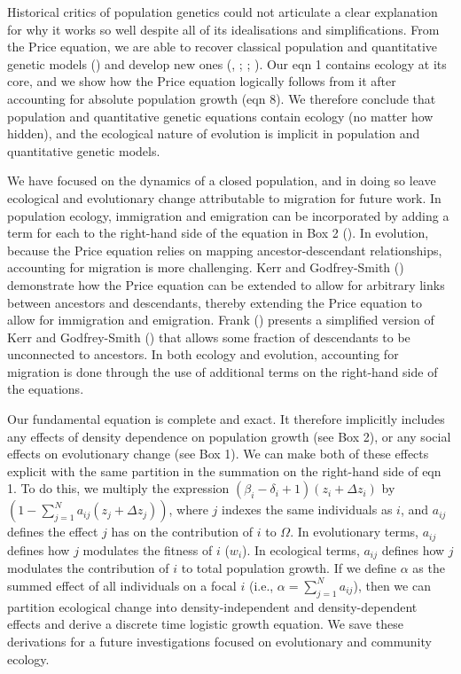 \documentclass[
]{article}
\begin{document}
Historical critics of population genetics could not articulate a clear
explanation for why it works so well despite all of its idealisations
and simplifications. From the Price equation, we are able to recover
classical population and quantitative genetic models
() and develop new ones
(, ;
; ). Our eqn 1 contains ecology at its core, and we show how the
Price equation logically follows from it after accounting for absolute
population growth (eqn 8). We therefore conclude that population and
quantitative genetic equations contain ecology (no matter how hidden),
and the ecological nature of evolution is implicit in population and
quantitative genetic models.

We have focused on the dynamics of a closed population, and in doing so
leave ecological and evolutionary change attributable to migration for
future work. In population ecology, immigration and emigration can be
incorporated by adding a term for each to the right-hand side of the
equation in Box 2 (). In
evolution, because the Price equation relies on mapping
ancestor-descendant relationships, accounting for migration is more
challenging. Kerr and Godfrey-Smith ()
demonstrate how the Price equation can be extended to allow for
arbitrary links between ancestors and descendants, thereby extending the
Price equation to allow for immigration and emigration. Frank
() presents a simplified version of Kerr
and Godfrey-Smith () that allows some
fraction of descendants to be unconnected to ancestors. In both ecology
and evolution, accounting for migration is done through the use of
additional terms on the right-hand side of the equations.

Our fundamental equation is complete and exact. It therefore implicitly
includes any effects of density dependence on population growth (see Box
2), or any social effects on evolutionary change (see Box 1). We can
make both of these effects explicit with the same partition in the
summation on the right-hand side of eqn 1. To do this, we multiply the
expression
\(\left(\beta_{i} - \delta_{i} + 1 \right)\left(z_{i} + \Delta z_{i} \right)\)
by
\(\left(1 - \sum_{j=1}^{N} a_{ij}\left(z_{j} + \Delta z_{j}\right)\right)\),
where \(j\) indexes the same individuals as \(i\), and \(a_{ij}\)
defines the effect \(j\) has on the contribution of \(i\) to \(\Omega\).
In evolutionary terms, \(a_{ij}\) defines how \(j\) modulates the
fitness of \(i\) (\(w_{i}\)). In ecological terms, \(a_{ij}\) defines
how \(j\) modulates the contribution of \(i\) to total population
growth. If we define \(\alpha\) as the summed effect of all individuals
on a focal \(i\) (i.e., \(\alpha = \sum_{j=1}^{N} a_{ij}\)), then we can
partition ecological change into density-independent and
density-dependent effects and derive a discrete time logistic growth
equation. We save these derivations for a future investigations focused
on evolutionary and community ecology.
\end{document}
